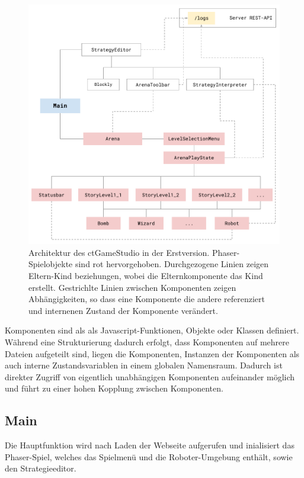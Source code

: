 \begin{figure} \label{architektur-alt} \caption{Architektur des ctGameStudio in der Erstversion.
  Phaser-Spielobjekte sind rot hervorgehoben. Durchgezogene Linien zeigen Eltern-Kind beziehungen,
  wobei die Elternkomponente das Kind erstellt. Gestrichlte Linien zwischen Komponenten zeigen
  Abhängigkeiten, so dass eine Komponente die andere referenziert und internenen Zustand der
  Komponente verändert.} \includegraphics{figures/architektur-alt.pdf} \end{figure}

Komponenten sind als  als Javascript-Funktionen, Objekte oder Klassen definiert. Während eine
Strukturierung dadurch erfolgt, dass Komponenten auf mehrere Dateien aufgeteilt sind, liegen die
Komponenten, Instanzen der Komponenten als auch interne Zustandsvariablen in einem globalen
Namensraum. Dadurch ist direkter Zugriff von eigentlich unabhängigen Komponenten aufeinander möglich
und führt zu einer hohen Kopplung zwischen Komponenten.

\subsection{Main}

Die Hauptfunktion wird nach Laden der Webseite aufgerufen und inialisiert das Phaser-Spiel, welches
das Spielmenü und die Roboter-Umgebung enthält, sowie den Strategieeditor.

